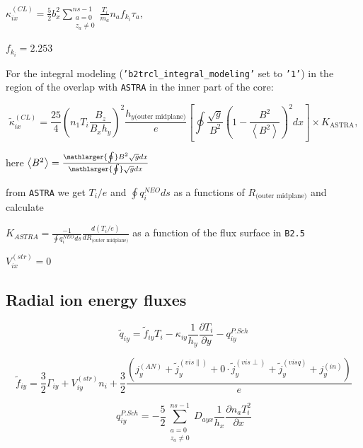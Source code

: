 \documentclass[a4paper,10pt]{report}
\begin{document}
$
\kappa_{ix}^{(CL)} =
\frac 5 2 b_x^2 \sum \limits^{ns-1}_{\substack{a = 0 \\ z_a \neq 0}} \frac{T_i}{m_a} n_a f_{k_i} \tau_a,
$

$f_{k_i} = 2.253$

For the integral modeling ({\tt 'b2trcl\_integral\_modeling'} set to {\tt '1'}) in the region of the overlap with {\tt ASTRA} in the inner part of the core:

\begin{equation}
\widetilde{\kappa}_{ix}^{(CL)} = \frac{25}4 \left(
	n_1 T_i \frac{B_z}{B_x h_y}
\right)^2
\frac{h_{y \text{(outer midplane)}}} e
\left[
\oint \frac{\sqrt g}{B^2} \left( 1-\frac{B^2}{\left\langle B^2 \right\rangle} \right)^2 dx
\right] \times K_{\text{ASTRA}},
\end{equation}

here $\left\langle B^2 \right\rangle = \frac{\mathlarger{\oint} B^2 \sqrt{g} dx}{\mathlarger{\oint} \sqrt g dx}$

from {\tt ASTRA} we get $T_i/e$ and $\oint q_i^{NEO} ds$ as a functions of $R_{\text{(outer midplane)}}$ and calculate

$K_{ASTRA} = \frac{-1}{\oint q_i^{NEO} ds} \frac{d(T_i/e)}{dR_{\text{(outer midplane)}}}$ as a function of the flux surface in {\tt B2.5}

$V_{ix}^{(str)}=0$

\subsection{Radial ion energy fluxes}

\begin{equation*}
\widetilde q_{iy} = \widetilde f_{iy} T_i -
\kappa_{iy} \frac 1{h_y} \frac{\partial T_i}{\partial y} -
q_{iy}^{P.Sch}
\end{equation*}

\begin{equation*}
\widetilde f_{iy} = \frac 3 2 \Gamma_{iy} + V_{iy}^{(str)} n_i + \frac 3 2 \frac{\left(
	j_y^{(AN)} + \widetilde j_y^{(vis \parallel)} + 0 \cdot \widetilde j_y^{(vis \perp)} + \widetilde j_y^{(visq)} + j_y^{(in)}
\right)} e
\end{equation*}

\begin{equation*}
q_{iy}^{P.Sch} = -\frac{5}{2} \sum \limits^{ns-1}_{\substack{a = 0 \\ z_a \neq 0}} D_{ayx}
\frac{1}{h_x} \frac{\partial n_a T^2_i}{\partial x}
\end{equation*}
\end{document}
